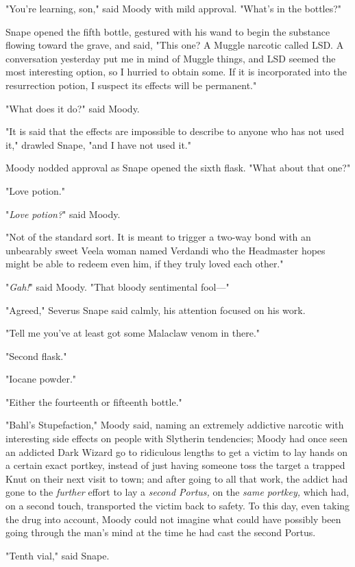 "You're learning, son," said Moody with mild approval. "What's in the bottles?"

Snape opened the fifth bottle, gestured with his wand to begin the substance 
flowing toward the grave, and said, "This one? A Muggle narcotic called LSD. A 
conversation yesterday put me in mind of Muggle things, and LSD seemed the most 
interesting option, so I hurried to obtain some. If it is incorporated into the 
resurrection potion, I suspect its effects will be permanent."

"What does it do?" said Moody.

"It is said that the effects are impossible to describe to anyone who has not 
used it," drawled Snape, "and I have not used it."

Moody nodded approval as Snape opened the sixth flask. "What about that one?"

"Love potion."

"\emph{Love potion?}" said Moody.

"Not of the standard sort. It is meant to trigger a two-way bond with an 
unbearably sweet Veela woman named Verdandi who the Headmaster hopes might be 
able to redeem even him, if they truly loved each other."

"\emph{Gah!}" said Moody. "That bloody sentimental fool---"

"Agreed," Severus Snape said calmly, his attention focused on his work.

"Tell me you've at least got some Malaclaw venom in there."

"Second flask."

"Iocane powder."

"Either the fourteenth or fifteenth bottle."

"Bahl's Stupefaction," Moody said, naming an extremely addictive narcotic with 
interesting side effects on people with Slytherin tendencies; Moody had once 
seen an addicted Dark Wizard go to ridiculous lengths to get a victim to lay 
hands on a certain exact portkey, instead of just having someone toss the 
target a trapped Knut on their next visit to town; and after going to all that 
work, the addict had gone to the \emph{further} effort to lay a \emph{second 
Portus,} on the \emph{same portkey,} which had, on a second touch, transported 
the victim back to safety. To this day, even taking the drug into account, 
Moody could not imagine what could have possibly been going through the man's 
mind at the time he had cast the second Portus.

"Tenth vial," said Snape.

